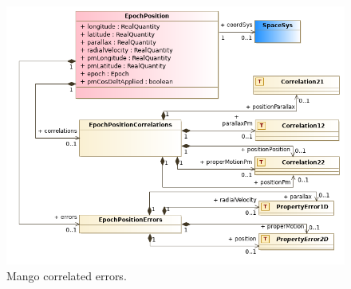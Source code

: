 \documentclass[11pt,a4paper]{ivoa}
\begin{document}
\begin{figure}
  \includegraphics[width=1.0\textwidth]{../model/mangoEpochPosition.png}
  \caption{Mango correlated errors.}
  \label{fig:epochPosition}
\end{figure}
\end{document}
